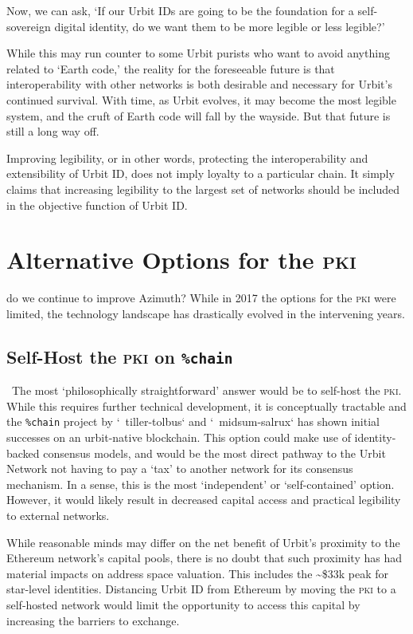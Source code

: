 \documentclass[twoside]{article}
\begin{document}
Now, we can ask, `If our Urbit IDs are going to be the foundation for a self-sovereign digital identity, do we want them to be more legible or less legible?'

While this may run counter to some Urbit purists who want to avoid anything related to `Earth code,' the reality for the foreseeable future is that interoperability with other networks is both desirable and necessary for Urbit's continued survival. With time, as Urbit evolves, it may become the most legible system, and the cruft of Earth code will fall by the wayside. But that future is still a long way off.

Improving legibility, or in other words, protecting the interoperability and extensibility of Urbit ID, does not imply loyalty to a particular chain. It simply claims that increasing legibility to the largest set of networks should be included in the objective function of Urbit ID.

\section{Alternative Options for the \textsc{pki}}

\How do we continue to improve Azimuth? While in 2017 the options for the \textsc{pki} were limited, the technology landscape has drastically evolved in the intervening years. 

\subsection{Self-Host the \textsc{pki} on \lstinline[style=inlinecode]{%chain}}
\
The most `philosophically straightforward' answer would be to self-host the \textsc{pki}. While this requires further technical development, it is conceptually tractable and the \lstinline[style=inlinecode]{%chain} project by `~tiller-tolbus` and `~midsum-salrux` has shown initial successes on an urbit-native blockchain. This option could make use of identity-backed consensus models, and would be the most direct pathway to the Urbit Network not having to pay a `tax' to another network for its consensus mechanism. In a sense, this is the most `independent' or `self-contained' option. However, it would likely result in decreased capital access and practical legibility to external networks.

While reasonable minds may differ on the net benefit of Urbit's proximity to the Ethereum network's capital pools, there is no doubt that such proximity has had material impacts on address space valuation. This includes the \textasciitilde\$33k peak for star-level identities. Distancing Urbit ID from Ethereum by moving the \textsc{pki} to a self-hosted network would limit the opportunity to access this capital by increasing the barriers to exchange.
\end{document}
